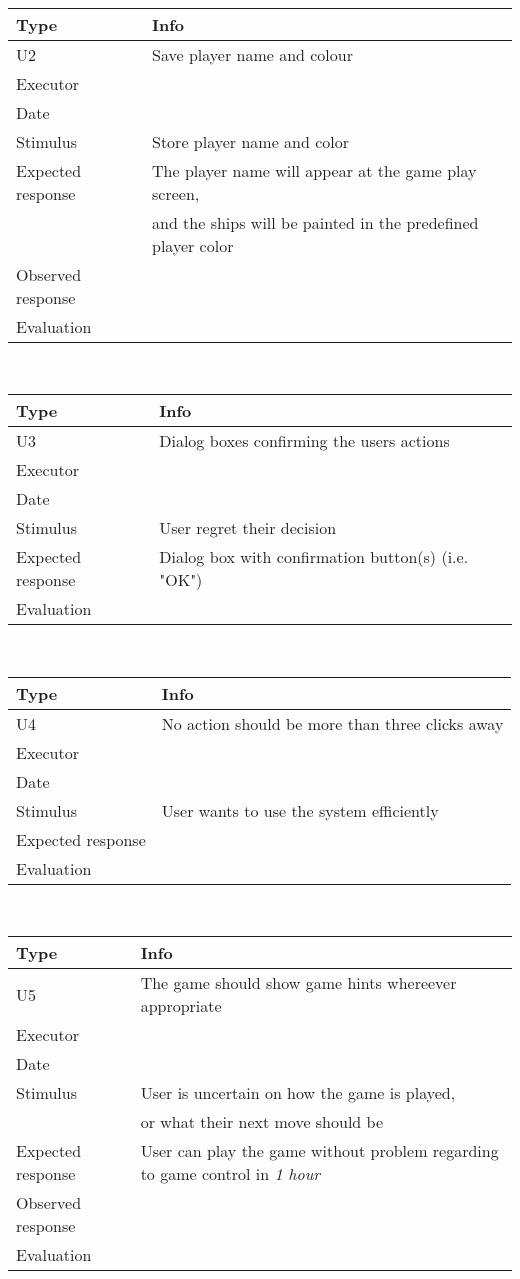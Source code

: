 \\
\begin{tabular}{|l|l|}
	\hline
	\bf{Type}	& \bf{Info} \\
	\hline
	U2			& Save player name and colour \\
	Executor	&  \\
	Date		& \date{\today} \\
	Stimulus	& Store player name and color \\
	Expected response & The player name will appear at the game play screen, \\
             & and the ships will be painted in the predefined player color  \\
	Observed response & \\
	Evaluation	&  \\
	\hline
\end{tabular}
\\
\begin{tabular}{|l|l|}
	\hline
	\bf{Type}	& \bf{Info} \\
	\hline
	U3			& Dialog boxes confirming the users actions \\
	Executor	&  \\
	Date		& \date{\today} \\
	Stimulus	& User regret their decision \\
	Expected response & Dialog box with confirmation button(s) (i.e. "OK")\\
	Evaluation	&  \\
	\hline
\end{tabular}
\\
\begin{tabular}{|l|l|}
	\hline
	\bf{Type}	& \bf{Info} \\
	\hline
	U4			& No action should be more than three clicks away \\
	Executor	&  \\
	Date		& \date{\today} \\
	Stimulus	& User wants to use the system efficiently \\
	Expected response &  \\
	Evaluation	&  \\
	\hline
\end{tabular}
\\
\begin{tabular}{|l|l|}
	\hline
	\bf{Type}	& \bf{Info} \\
	\hline
	U5			& The game should show game hints whereever appropriate \\
	Executor	&  \\
	Date		& \date{\today} \\
	Stimulus	& User is uncertain on how the game is played, \\
             & or what their next move should be \\
	Expected response & User can play the game without problem regarding to game control in \emph{1 hour}\\
	Observed response & \\
	Evaluation	&  \\
	\hline
\end{tabular}
\\
